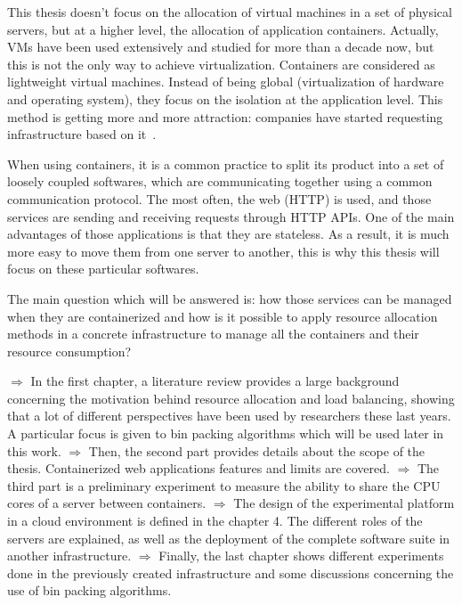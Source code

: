 This thesis doesn't focus on the allocation of virtual machines in a set of
physical servers, but at a higher level, the allocation of application
containers. Actually, VMs have been used extensively and studied for more than
a decade now, but this is not the only way to achieve virtualization.
Containers are considered as lightweight virtual machines. Instead of being
global (virtualization of hardware and operating system), they focus on the
isolation at the application level. This method is getting more and more
attraction: companies have started requesting infrastructure based on
it~\cite{dockerOverVMWare}.

When using containers, it is a common practice to split its product into
a set of loosely coupled softwares, which are communicating together using
a common communication protocol. The most often, the web (HTTP) is used, and those
services are sending and receiving requests through HTTP APIs\@. One of the main
advantages of those applications is that they are stateless. As a result, it is
much more easy to move them from one server to another, this is why this thesis
will focus on these particular softwares.

The main question which will be answered is: how those services can be managed
when they are containerized and how is it possible to apply resource allocation
methods in a concrete infrastructure to manage all the containers and their
resource consumption?

$\Rightarrow$ In the first chapter, a literature review provides a large
background concerning the motivation behind resource allocation and load
balancing, showing that a lot of different perspectives have been used by
researchers these last years. A particular focus is given to bin packing
algorithms which will be used later in this work. \vspace{5pt} \newline
$\Rightarrow$ Then, the second part provides details about the scope of
the thesis. Containerized web applications features and limits are covered.
\vspace{5pt} \newline $\Rightarrow$ The third part is a preliminary experiment
to measure the ability to share the CPU cores of a server between containers.
\vspace{5pt} \newline $\Rightarrow$ The design of the experimental platform in
a cloud environment is defined in the chapter 4. The different roles of the
servers are explained, as well as the deployment of the complete software suite
in another infrastructure.\vspace{5pt} \newline $\Rightarrow$ Finally, the
last chapter shows different experiments done in the previously created
infrastructure and some discussions concerning the use of bin packing
algorithms.

 
